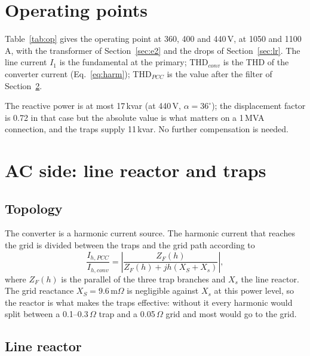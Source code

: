 \documentclass[11pt,a4paper]{article}
\newcommand{\ex}{e_x}
\begin{document}
\section{Operating points}

Table~\ref{tab:op} gives the operating point at 360, 400 and 440\,V, at 1050 and 1100\,A, with the transformer of Section~\ref{sec:e2} and the drops of Section~\ref{sec:lr}. The line current $I_1$ is the fundamental at the primary; THD$_{conv}$ is the THD of the converter current (Eq.~\eqref{eq:harm}); THD$_{PCC}$ is the value after the filter of Section~\ref{sec:acfilter}.

\begin{table}[h]
\centering

\caption{Operating points at 16.4\,V output; $\ex = 6$\,\%, $e_r = 2.7$\,\%, $V_T = 1.3$\,V, ratio 23.5.}
\label{tab:op}
\end{table}

The reactive power is at most 17\,kvar (at 440\,V, $\alpha = 36^\circ$); the displacement factor is 0.72 in that case but the absolute value is what matters on a 1\,MVA connection, and the traps supply 11\,kvar. No further compensation is needed.

\section{AC side: line reactor and traps}
\label{sec:acfilter}

\subsection{Topology}

The converter is a harmonic current source. The harmonic current that reaches the grid is divided between the traps and the grid path according to
\begin{equation}
\frac{I_{h,PCC}}{I_{h,conv}} = \left|\frac{Z_F(h)}{Z_F(h) + jh(X_S + X_s)}\right|,
\label{eq:share}
\end{equation}
where $Z_F(h)$ is the parallel of the three trap branches and $X_s$ the line reactor. The grid reactance $X_S = 9.6$\,m$\Omega$ is negligible against $X_s$ at this power level, so the reactor is what makes the traps effective: without it every harmonic would split between a 0.1--0.3\,$\Omega$ trap and a 0.05\,$\Omega$ grid and most would go to the grid.

\subsection{Line reactor}
\end{document}
